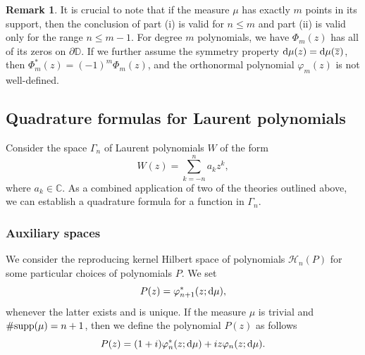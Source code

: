 \documentclass[reqno, a4paper]{amsart}
\def\C{\mathbb{C}}
\def\supp{{\rm supp}}
\renewcommand{\d}{\text{\rm d}}
\newcommand{\dD}{\partial\mathbb{D}}
\theoremstyle{plain}
\theoremstyle{definition}
\theoremstyle{remarkstyle}
\newtheorem*{remark}{Remark}
\numberwithin{equation}{section}
\begin{document}
\begin{remark}\label{rem:properties-of-opuc-for-trivial-measures}
    It is crucial to note that if the measure $\mu$ has exactly $m$ points in its support, then the conclusion of part (i) is valid for $n\leq m$ and part (ii) is valid only for the range $n\leq m-1$. For degree $m$ polynomials, we have $\Phi_m(z)$ has all of its zeros on $\dD$. If we further assume the symmetry property $\d\mu(z)=\d\mu(\overline{z})$, then $\Phi_m^\ast(z)=(-1)^m \Phi_m(z)$, and the orthonormal polynomial $\varphi_m(z)$ is not well-defined.
\end{remark}



\subsection{Quadrature formulas for Laurent polynomials} Consider the space $\Gamma_n$ of Laurent polynomials $W$ of the form 
\begin{equation*}
    W(z)=\sum_{k=-n}^n a_k z^k,
\end{equation*}
where $a_k\in \C$. As a combined application of two of the theories outlined above, we can establish a quadrature formula for a function in $\Gamma_n$. 

\subsubsection{Auxiliary spaces}\label{subsec:auxiliary-spaces} We consider the reproducing kernel Hilbert space of polynomials $\mathcal{H}_n(P)$ for some particular choices of polynomials $P$. 
We set 
\begin{equation}\label{eq:choice-of-polynomial-p-as-orthonormal}
    P(z)=\varphi_{n+1}^*(z;\d\mu),    
\end{equation}
whenever the latter exists and is unique.
If the measure $\mu$ is trivial and $\#\supp(\mu)=n+1$, then we define the polynomial $P(z)$ as follows
\begin{equation}\label{eq:choice-of-polynomial-p}
    P(z)=(1+i)\varphi_{n}^*(z;\d\mu) + i z \varphi_{n}(z;\d\mu).
\end{equation}
\end{document}
